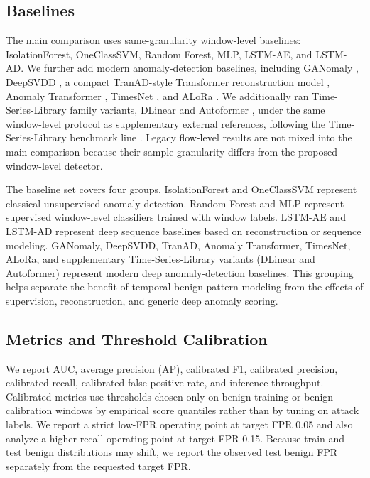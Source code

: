 \documentclass[conference]{IEEEtran}
\begin{document}
\subsection{Baselines}
The main comparison uses same-granularity window-level baselines: IsolationForest, OneClassSVM, Random Forest, MLP, LSTM-AE, and LSTM-AD. We further add modern anomaly-detection baselines, including GANomaly \cite{akcay2018ganomaly}, DeepSVDD \cite{ruff2018deep}, a compact TranAD-style Transformer reconstruction model \cite{tuli2022tranad}, Anomaly Transformer \cite{xu2022anomalytransformer}, TimesNet \cite{wu2023timesnet}, and ALoRa \cite{alora_repo}. We additionally ran Time-Series-Library family variants, DLinear \cite{zeng2023dlinear} and Autoformer \cite{wu2021autoformer}, under the same window-level protocol as supplementary external references, following the Time-Series-Library benchmark line \cite{wu2023timesnet,wang2024tssurvey}. Legacy flow-level results are not mixed into the main comparison because their sample granularity differs from the proposed window-level detector.

The baseline set covers four groups. IsolationForest and OneClassSVM represent classical unsupervised anomaly detection. Random Forest and MLP represent supervised window-level classifiers trained with window labels. LSTM-AE and LSTM-AD represent deep sequence baselines based on reconstruction or sequence modeling. GANomaly, DeepSVDD, TranAD, Anomaly Transformer, TimesNet, ALoRa, and supplementary Time-Series-Library variants (DLinear and Autoformer) represent modern deep anomaly-detection baselines. This grouping helps separate the benefit of temporal benign-pattern modeling from the effects of supervision, reconstruction, and generic deep anomaly scoring.

\subsection{Metrics and Threshold Calibration}
We report AUC, average precision (AP), calibrated F1, calibrated precision, calibrated recall, calibrated false positive rate, and inference throughput. Calibrated metrics use thresholds chosen only on benign training or benign calibration windows by empirical score quantiles rather than by tuning on attack labels. We report a strict low-FPR operating point at target FPR 0.05 and also analyze a higher-recall operating point at target FPR 0.15. Because train and test benign distributions may shift, we report the observed test benign FPR separately from the requested target FPR.
\end{document}
